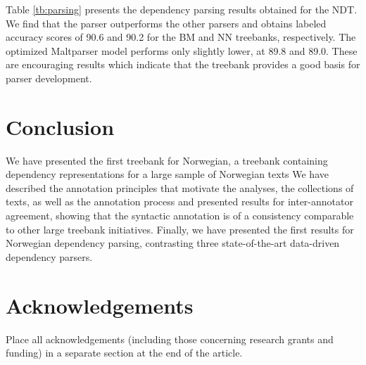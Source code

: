 \documentclass[10pt,a4paper]{article}
\begin{document}
Table \ref{tb:parsing} presents the dependency parsing results
obtained for the NDT. We find that the  parser
outperforms the other parsers and obtains labeled accuracy scores of
90.6 and 90.2 for the BM and NN treebanks, respectively.  The
optimized Maltparser model performs only slightly lower, at 89.8 and
89.0.  These are encouraging results which indicate that the treebank
provides a good basis for parser development.

\section{Conclusion}
We have presented the first treebank for Norwegian, a treebank
containing dependency representations for a large sample of Norwegian
texts
We have described the
annotation principles that motivate the analyses, the collections of
texts, as well as the annotation process and presented results for
inter-annotator agreement, showing that the syntactic annotation is of
a consistency comparable to other large treebank initiatives. Finally,
we have presented the first results for Norwegian dependency parsing,
contrasting three state-of-the-art data-driven dependency parsers.

\section{Acknowledgements}

Place all acknowledgements (including those concerning research grants and funding) in a separate section at the end of the article.





\end{document}
